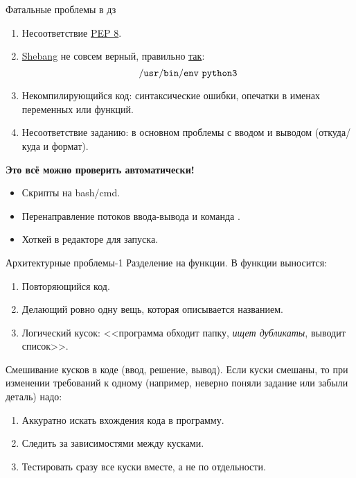 \documentclass[utf8,xcolor=table]{beamer}
\renewcommand{\t}[1]{\ifmmode{\mathtt{#1}}\else{\texttt{#1}}\fi}
\begin{document}
\begin{frame}[t]{Фатальные проблемы в дз}
	\begin{enumerate}
		\item Несоответствие \href{https://www.python.org/dev/peps/pep-0008/}{PEP 8}.
		\item \href{https://ru.wikipedia.org/wiki/\%D0\%A8\%D0\%B5\%D0\%B1\%D0\%B0\%D0\%BD\%D0\%B3_(Unix)}{Shebang} не совсем верный, правильно 
			\href{http://stackoverflow.com/a/19305076/767632}{так}:
			\[ \t{/usr/bin/env~python3} \]
		\item Некомпилирующийся код: синтаксические ошибки, опечатки в именах переменных или функций.
		\item Несоответствие заданию: в основном проблемы с вводом и выводом (откуда/куда и формат).
	\end{enumerate}
	\begin{center}
		\textbf{Это всё можно проверить автоматически!}
	\end{center}
	\begin{itemize}
		\item Скрипты на bash/cmd.
		\item Перенаправление потоков ввода-вывода и команда \t{diff}.
		\item Хоткей в редакторе для запуска.
	\end{itemize}
\end{frame}

\begin{frame}[t]{Архитектурные проблемы-1}
	Разделение на функции. В функции выносится:
	\begin{enumerate}
		\item Повторяющийся код.
		\item Делающий ровно одну вещь, которая описывается названием.
		\item Логический кусок: <<программа обходит папку, \textit{ищет дубликаты}, выводит список>>.
	\end{enumerate}

	Смешивание кусков в коде (ввод, решение, вывод).
	Если куски смешаны, то при изменении требований к одному (например, неверно поняли задание или забыли деталь) надо:
	\begin{enumerate}
		\item Аккуратно искать вхождения кода в программу.
		\item Следить за зависимостями между кусками.
		\item Тестировать сразу все куски вместе, а не по отдельности.
	\end{enumerate}
\end{frame}
\end{document}
